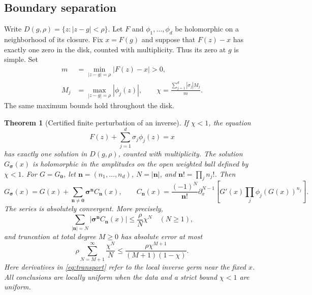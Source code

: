 \documentclass[11pt,a4paper]{article}
\numberwithin{equation}{section}
\newtheorem{theorem}{Theorem}[section]
\theoremstyle{definition}
\theoremstyle{remark}
\newcommand{\bn}{\boldsymbol n}
\newcommand{\bs}{\boldsymbol\sigma}
\begin{document}
\subsection{Boundary separation}
Write $D(g,\rho)=\{z:|z-g|<\rho\}$. Let $F$ and $\phi_1,\ldots,\phi_d$ be holomorphic on a neighborhood of its closure. Fix $x=F(g)$ and suppose that $F(z)-x$ has exactly one zero in the disk, counted with multiplicity. Thus its zero at $g$ is simple. Set
\begin{align}
 m&=\min_{|z-g|=\rho}|F(z)-x|>0,\label{eq:m}\\
 M_j&=\max_{|z-g|=\rho}|\phi_j(z)|,\qquad
 \chi=\frac{\sum_{j=1}^d|\sigma_j|M_j}{m}.
 \label{eq:chi}
\end{align}
The same maximum bounds hold throughout the disk.

\begin{theorem}[Certified finite perturbation of an inverse]
\label{thm:transport}
If $\chi<1$, the equation
\begin{equation}
 F(z)+\sum_{j=1}^d\sigma_j\phi_j(z)=x
 \label{eq:perturbed}
\end{equation}
has exactly one solution in $D(g,\rho)$, counted with multiplicity. The solution $G_{\bs}(x)$ is holomorphic in the amplitudes on the open weighted ball defined by $\chi<1$. For $G=G_{\boldsymbol0}$, let $\bn=(n_1,\ldots,n_d)$, $N=|\bn|$, and $\bn!=\prod_jn_j!$. Then
\begin{equation}
 G_{\bs}(x)=G(x)+\sum_{\bn\neq\boldsymbol0}\bs^{\bn}C_{\bn}(x),
 \qquad
 C_{\bn}(x)=\frac{(-1)^N}{\bn!}
 \partial_x^{N-1}\left[G'(x)\prod_j\phi_j(G(x))^{n_j}\right].
 \label{eq:transport}
\end{equation}
The series is absolutely convergent. More precisely,
\begin{equation}
 \sum_{|\bn|=N}|\bs^{\bn}C_{\bn}(x)|
 \leq\frac{\rho}{N}\chi^N\quad(N\geq1),
 \label{eq:homogeneous-bound}
\end{equation}
and truncation at total degree $M\geq0$ has absolute error at most
\begin{equation}
 \rho\sum_{N=M+1}^{\infty}\frac{\chi^N}{N}
 \leq \frac{\rho\chi^{M+1}}{(M+1)(1-\chi)}.
 \label{eq:tail}
\end{equation}
Here derivatives in \eqref{eq:transport} refer to the local inverse germ near the fixed $x$. All conclusions are locally uniform when the data and a strict bound $\chi<1$ are uniform.
\end{theorem}
\end{document}
